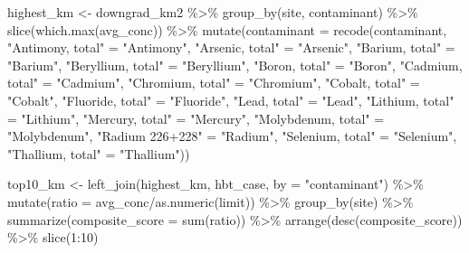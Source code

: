 \documentclass[12pt, twoside]{amherstthesis}
\newenvironment{Shaded}{\begin{snugshade}}{\end{snugshade}}
\newcommand{\AttributeTok}[1]{\textcolor[rgb]{0.77,0.63,0.00}{#1}}
\newcommand{\DecValTok}[1]{\textcolor[rgb]{0.00,0.00,0.81}{#1}}
\newcommand{\FunctionTok}[1]{\textcolor[rgb]{0.00,0.00,0.00}{#1}}
\newcommand{\NormalTok}[1]{#1}
\newcommand{\OtherTok}[1]{\textcolor[rgb]{0.56,0.35,0.01}{#1}}
\newcommand{\SpecialCharTok}[1]{\textcolor[rgb]{0.00,0.00,0.00}{#1}}
\newcommand{\StringTok}[1]{\textcolor[rgb]{0.31,0.60,0.02}{#1}}
\begin{document}
\begin{Shaded}
\begin{Highlighting}[]
\NormalTok{highest\_km }\OtherTok{\textless{}{-}}\NormalTok{ downgrad\_km2 }\SpecialCharTok{\%\textgreater{}\%}
  \FunctionTok{group\_by}\NormalTok{(site, contaminant) }\SpecialCharTok{\%\textgreater{}\%}
  \FunctionTok{slice}\NormalTok{(}\FunctionTok{which.max}\NormalTok{(avg\_conc)) }\SpecialCharTok{\%\textgreater{}\%}
  \FunctionTok{mutate}\NormalTok{(}\AttributeTok{contaminant =} \FunctionTok{recode}\NormalTok{(contaminant,}
                              \StringTok{"Antimony, total"} \OtherTok{=} \StringTok{"Antimony"}\NormalTok{,}
                              \StringTok{"Arsenic, total"} \OtherTok{=} \StringTok{"Arsenic"}\NormalTok{,}
                              \StringTok{"Barium, total"} \OtherTok{=} \StringTok{"Barium"}\NormalTok{,}
                              \StringTok{"Beryllium, total"} \OtherTok{=} \StringTok{"Beryllium"}\NormalTok{,}
                              \StringTok{"Boron, total"} \OtherTok{=} \StringTok{"Boron"}\NormalTok{,}
                              \StringTok{"Cadmium, total"} \OtherTok{=} \StringTok{"Cadmium"}\NormalTok{,}
                              \StringTok{"Chromium, total"} \OtherTok{=} \StringTok{"Chromium"}\NormalTok{,}
                              \StringTok{"Cobalt, total"} \OtherTok{=} \StringTok{"Cobalt"}\NormalTok{,}
                              \StringTok{"Fluoride, total"} \OtherTok{=} \StringTok{"Fluoride"}\NormalTok{,}
                              \StringTok{"Lead, total"} \OtherTok{=} \StringTok{"Lead"}\NormalTok{,}
                              \StringTok{"Lithium, total"} \OtherTok{=} \StringTok{"Lithium"}\NormalTok{,}
                              \StringTok{"Mercury, total"} \OtherTok{=} \StringTok{"Mercury"}\NormalTok{,}
                              \StringTok{"Molybdenum, total"} \OtherTok{=} \StringTok{"Molybdenum"}\NormalTok{,}
                              \StringTok{"Radium 226+228"} \OtherTok{=} \StringTok{"Radium"}\NormalTok{,}
                              \StringTok{"Selenium, total"} \OtherTok{=} \StringTok{"Selenium"}\NormalTok{,}
                              \StringTok{"Thallium, total"} \OtherTok{=} \StringTok{"Thallium"}\NormalTok{))}

\NormalTok{top10\_km }\OtherTok{\textless{}{-}} \FunctionTok{left\_join}\NormalTok{(highest\_km, hbt\_case, }\AttributeTok{by =} \StringTok{"contaminant"}\NormalTok{) }\SpecialCharTok{\%\textgreater{}\%}
  \FunctionTok{mutate}\NormalTok{(}\AttributeTok{ratio =}\NormalTok{ avg\_conc}\SpecialCharTok{/}\FunctionTok{as.numeric}\NormalTok{(limit)) }\SpecialCharTok{\%\textgreater{}\%}
  \FunctionTok{group\_by}\NormalTok{(site) }\SpecialCharTok{\%\textgreater{}\%}
  \FunctionTok{summarize}\NormalTok{(}\AttributeTok{composite\_score =} \FunctionTok{sum}\NormalTok{(ratio)) }\SpecialCharTok{\%\textgreater{}\%}
  \FunctionTok{arrange}\NormalTok{(}\FunctionTok{desc}\NormalTok{(composite\_score)) }\SpecialCharTok{\%\textgreater{}\%}
  \FunctionTok{slice}\NormalTok{(}\DecValTok{1}\SpecialCharTok{:}\DecValTok{10}\NormalTok{)}
\end{Highlighting}
\end{Shaded}
\backmatter
\end{document}
